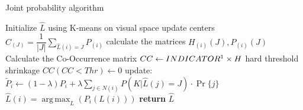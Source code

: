 \documentclass{article}
\DeclareMathOperator*{\argmax}{arg\,max}
\begin{document}
\begin{algorithm}[!h] 
	\caption{Joint probability algorithm}\label{alg:Jointprobability}
	\begin{algorithmic}
		\State Initialize $\hat L$ using K-means on visual space
		\Loop
		\State update centers $C_{(J)}=\dfrac{1}{|J|} \sum_{\hat{L}(i)=J}^{}P_{(i)}$
		\State calculate the matrices $ H_{(i)}(J),P_{(i)}(J) $
		\State Calculate the Co-Occurrence matrix  $ CC\gets INDICATOR\footnotemark\times H $
		\State hard threshold shrinkage $ CC(CC<Thr)\gets 0 $ 
		\State update: $ \widetilde{P}_i \leftarrow (1-\lambda)P_i + \lambda\sum_{j\in N(i)}^{} P(K|\hat{L}(j)=J)\cdot \Pr\{j\} $
		\State $ \hat{L}(i)=\argmax _L(  P_i(L(i))  ) $
		\EndLoop
		\State \textbf{return} $\hat{L}$
		
	\end{algorithmic}
\end{algorithm}
\end{document}
